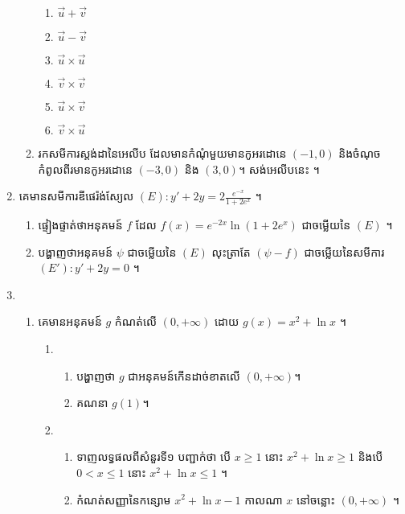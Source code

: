 \documentclass{officialexam}
\begin{document}
\begin{enumerate}[I]
\begin{enumerate}[1]
			\begin{enumerate}[k,6]
				\item $\overrightarrow{u}+\overrightarrow{v}$
				\item $\overrightarrow{u}-\overrightarrow{v}$
				\item $\overrightarrow{u}\times\overrightarrow{u}$
				\item $\overrightarrow{v}\times\overrightarrow{v}$
				\item $\overrightarrow{u}\times\overrightarrow{v}$
				\item $\overrightarrow{v}\times\overrightarrow{u}$
			\end{enumerate}
			\item រកសមីការស្តង់ដានៃអេលីប ដែលមានកំណុំមួយមានកូអរដោនេ $\left(-1,0\right)$ និងចំណុចកំពូលពីរមានកូអរដោនេ $\left(-3,0\right)$ និង $\left(3,0\right)$។ សង់អេលីបនេះ ។
		\end{enumerate}
		\item គេមានសមីការឌីផេរ៉ង់ស្យែល $(E): y'+2y=2\frac{e^{-x}}{1+2e^x}$ ។
		\begin{enumerate}[k]
			\item ផ្ទៀងផ្ទាត់ថាអនុគមន៍ $f$ ដែល $f(x)=e^{-2x}\ln\left(1+2e^x\right)$ ជាចម្លើយនៃ $(E)$ ។
			\item បង្ហាញថាអនុគមន៍ $\psi$ ជាចម្លើយនៃ $(E)$ លុះត្រាតែ $\left(\psi-f\right)$ ជាចម្លើយនៃសមីការ $(E'): y'+2y=0$ ។
		\end{enumerate}
		\item \begin{enumerate}[A]
			\item គេមានអនុគមន៍ $g$ កំណត់លើ $\left(0, +\infty\right)$ ដោយ $g(x)=x^2+\ln x$ ។
			\begin{enumerate}[1]
				\item \begin{enumerate}[k]
					\item បង្ហាញថា $g$ ជាអនុគមន៍កើនដាច់ខាតលើ $\left(0, +\infty\right)$។
					\item គណនា $g(1)$។
				\end{enumerate}
				\item \begin{enumerate}[k]
					\item ទាញលទ្ធផលពីសំនួរទី១ បញ្ជាក់ថា បើ $x\geq1$ នោះ $x^2+\ln x\geq1$ និងបើ $0<x\leq1$ នោះ $x^2+\ln x\leq1$ ។
					\item កំណត់សញ្ញានៃកន្សោម $x^2+\ln x-1$ កាលណា $x$ នៅចន្លោះ $\left(0,+\infty\right)$ ។
				\end{enumerate}
			\end{enumerate}

\end{enumerate}
\end{enumerate}
\end{document}
